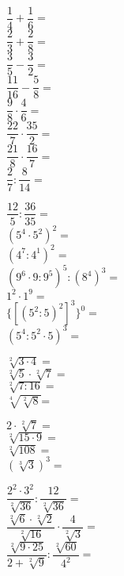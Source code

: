 \documentclass[14pt]{extarticle}
\begin{document}
\begin{spacing}{2.2}
\begin{minipage}[t]{0.5\textwidth}
    \(\dfrac{1}{4}+\dfrac{1}{6}=\)\\
    \(\dfrac{2}{3}+\dfrac{2}{8}=\)\\
    \(\dfrac{3}{5}-\dfrac{3}{2}=\)\\
    \(\dfrac{11}{16}-\dfrac{5}{8}=\)\\
    \(\dfrac{9}{8}\cdot\dfrac{4}{6}=\)\\
    \(\dfrac{22}{7}\cdot\dfrac{35}{2}=\)\\
    \(\dfrac{21}{8}\cdot\dfrac{16}{7}=\)\\
    \(\dfrac{2}{7}:\dfrac{8}{14}=\)\\
\end{minipage}
\begin{minipage}[t]{0.5\textwidth}
    \(\dfrac{12}{5}:\dfrac{36}{35}=\)\\
    \((5^4\cdot5^2)^2=\)\\
    \((4^7:4^1)^2=\)\\
    \((9^6\cdot9:9^5)^5:(8^4)^3=\)\\
    \(1^{2}\cdot1^9=\)\\
    \(\{[(5^2:5)^2]^3\}^0=\)\\
    \((5^4:5^2\cdot5)^3=\)\\
\end{minipage}
\end{spacing}
\begin{spacing}{2}
\begin{minipage}[t]{0.5\textwidth}
\(\sqrt[2]{3\cdot4}=\)\\
\(\sqrt[2]{5}\cdot\sqrt[2]{7}=\)\\
\(\sqrt[2]{7:16}=\)\\
\(\sqrt[4]{\sqrt[2]{8}}\)=\\
\end{minipage}
\begin{minipage}[t]{0.5\textwidth}
\(2\cdot\sqrt[2]{7}=\)\\
\(\sqrt[2]{15\cdot9}=\)\\
\(\sqrt[2]{108}=\)\\ 
\((\sqrt[3]{3})^3=\)\\
\end{minipage}
\end{spacing}
\begin{spacing}{3}
\begin{minipage}[t]{0.5\textwidth}
    \(\dfrac{2^2\cdot3^2}{\sqrt[2]{36}}:\dfrac{12}{\sqrt[2]{36}}=\)\\
    \(\dfrac{\sqrt[2]{6}\cdot\sqrt[2]{2}}{\sqrt[2]{16}}\cdot\dfrac{4}{\sqrt[2]{3}}=\)\\
    \(\dfrac{\sqrt[2]{9\cdot 25}}{2+\sqrt[2]{9}}:\dfrac{\sqrt[2]{60}}{4^2}=\)\\
\end{minipage}
\end{spacing}
\end{document}
